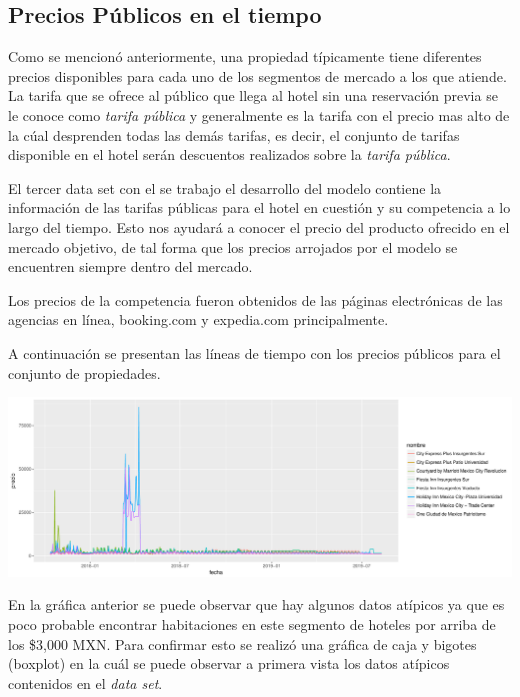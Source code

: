 \subsection*{Precios Públicos en el tiempo}

Como se mencionó anteriormente, una propiedad típicamente tiene diferentes precios disponibles para cada uno de los segmentos de mercado a los que atiende. La tarifa que se ofrece al público que llega al hotel sin una reservación previa se le conoce como \emph{tarifa pública} y generalmente es la tarifa con el precio mas alto de la cúal desprenden todas las demás tarifas, es decir, el conjunto de tarifas disponible en el hotel serán descuentos realizados sobre la \emph{tarifa pública}.

El tercer data set con el se trabajo el desarrollo del modelo contiene la información de las tarifas públicas para el hotel en cuestión y su competencia a lo largo del tiempo. Esto nos ayudará a conocer el precio del producto ofrecido en el mercado objetivo, de tal forma que los precios arrojados por el modelo se encuentren siempre dentro del mercado.

Los precios de la competencia fueron obtenidos de las páginas electrónicas de las agencias en línea, booking.com y expedia.com principalmente.

A continuación se presentan las líneas de tiempo con los precios públicos para el conjunto de propiedades.

\color{fgcolor}
\includegraphics[width=\maxwidth]{figures/PreciosGraf-1} 

En la gráfica anterior se puede observar que hay algunos datos atípicos ya que es poco probable encontrar habitaciones en este segmento de hoteles por arriba de los \$3,000 MXN. Para confirmar esto se realizó una gráfica de caja y bigotes (boxplot) en la cuál se puede observar a primera vista los datos atípicos contenidos en el \emph{data set}.


